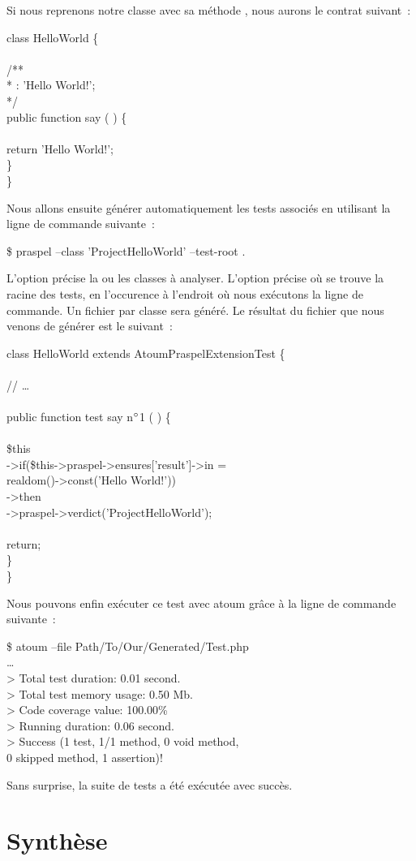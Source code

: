 Si nous reprenons notre classe  avec sa méthode
, nous aurons le contrat suivant~:
%
\begin{pre}
class HelloWorld \{ \\
 \\
    /** \\
     * \aensures \aresult: 'Hello World!'; \\
     */ \\
    public function say ( ) \{ \\
 \\
        return 'Hello World!'; \\
    \} \\
\}
\end{pre}
%
Nous allons ensuite générer automatiquement les tests associés en utilisant la
ligne de commande suivante~:
%
\begin{pre}
\$ praspel --class 'Project\bslash{}HelloWorld' --test-root .
\end{pre}
%
L'option  précise la ou les classes à analyser. L'option
 précise où se trouve la racine des tests, en
l'occurence à l'endroit où nous exécutons la ligne de commande. Un fichier par
classe sera généré. Le résultat du fichier que nous venons de générer est le
suivant~:
%
\begin{bigpre}
class HelloWorld extends \bslash{}Atoum\bslash{}PraspelExtension\bslash{}Test \{ \\
 \\
    // … \\
 \\
    public function test say n\(\sp{\circ}\)1 ( ) \{ \\
 \\
        \$this \\
            ->if(\$this->praspel->ensures['\bslash{}result']->in = \\
                realdom()->const('Hello World!')) \\
            ->then \\
                ->praspel->verdict('\bslash{}Project\bslash{}HelloWorld');  \\
 \\
        return; \\
    \} \\
\}
\end{bigpre}
%
Nous pouvons enfin exécuter ce test avec atoum grâce à la ligne de commande
suivante~:
%
\begin{pre}
\$ atoum --file Path/To/Our/Generated/Test.php \\
… \\
> Total test duration: 0.01 second. \\
> Total test memory usage: 0.50 Mb. \\
> Code coverage value: 100.00\% \\
> Running duration: 0.06 second. \\
> Success (1 test, 1/1 method, 0 void method, \\
           0 skipped method, 1 assertion)!
\end{pre}
%
Sans surprise, la suite de tests a été exécutée avec succès.

\section{Synthèse}
